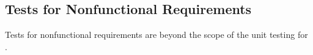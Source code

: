 \documentclass[12pt, titlepage]{article}
\begin{document}


					
					
					


					

					
					
					



    



\subsection{Tests for Nonfunctional Requirements}

Tests for nonfunctional requirements are beyond the scope of the unit testing for \progname{}.


\end{document}
